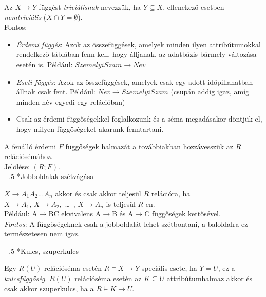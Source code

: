\documentclass[tikz,12pt,margin=0px]{article}
\makeatletter
\renewcommand\paragraph{%
	\@startsection{paragraph}{4}{0mm}%
	{-\baselineskip}%
	{.5\baselineskip}%
	{\normalfont\normalsize\bfseries}}
\makeatother
\begin{document}
{    \noindent Az $X \to Y$ függést \emph{triviálisnak} nevezzük, ha $Y \subseteq X$, ellenekező esetben \emph{nemtriviális} ($X \cap Y = \emptyset$).\\

    \noindent Fontos:
    \begin{itemize}
        \item \emph{Érdemi függés}: Azok az összefüggések, amelyek minden ilyen attribútumokkal rendelkező táblában fenn kell, hogy álljanak, az adatbázis bármely változása esetén is.
        \subitem Például: $SzemelyiSzam \to Nev$
        \item \emph{Eseti függés}: Azok az összefüggések, amelyek csak egy adott időpillanatban állnak csak fent.
        \subitem Például: $Nev \to SzemelyiSzam$ (csupán addig igaz, amíg minden név egyedi egy relációban)
        \item Csak az érdemi függőségekkel foglalkozunk és a séma megadásakor döntjük el, hogy milyen függőségeket akarunk fenntartani.
    \end{itemize}

    \noindent A fenálló érdemi $F$ függőségek halmazát a továbbiakban hozzávesszük az $R$ relációsémához.\\
    Jelölése: $(R; F)$.\\

    \paragraph*{Jobboldalak szétvágása\\}

    $X \to A_1A_2...A_n$ akkor és csak akkor teljesül $R$ relációra, ha\\
    $X \to A_1$, $X \to A_2$,\ \ldots\ , $X \to A_n$ is teljesül $R$-en. \\
    Például: A$\to$BC ekvivalens A$\to$B és A$\to$C függőségek kettősével.\\

    \noindent \emph{Fontos}: A függőségeknek csak a jobboldalát lehet szétbontani, a baloldalra ez természetesen nem igaz.

    \paragraph*{Kulcs, szuperkulcs\\}

    Egy $R(U)$ relációséma esetén $R \models X \to Y$ speciális esete, ha $Y = U$, ez a \emph{kulcsfüggőség}. $R(U)$ relációséma esetén az $K \subseteq U$ attribútumhalmaz akkor és csak akkor szuperkulcs, ha a $R \models K \to U$. \\

}
\end{document}

